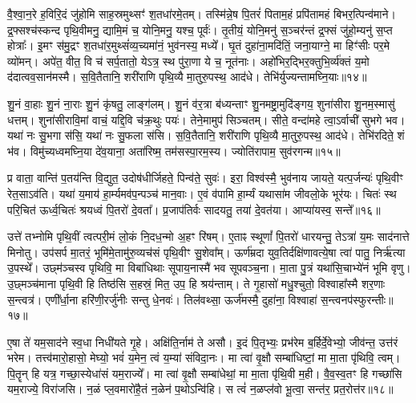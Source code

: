 वै॒श्वा॒न॒रे ह॒विरि॒दं जु॑होमि साह॒स्रमुथ्सꣳ॑ श॒तधा॑रमे॒तम्। 
तस्मि॑न्ने॒ष पि॒तरं॑ पिताम॒हं प्रपि॑तामहं बिभर॒त्पिन्व॑माने। 
द्र॒फ्सश्च॑स्कन्द पृथि॒वीमनु॒ द्यामि॒मं च॒ योनि॒मनु॒ यश्च॒ पूर्वः॑। 
तृ॒तीयं॒ योनि॒मनु॑ स॒ञ्चर॑न्तं द्र॒फ्सं जु॑हो॒म्यनु॑ स॒प्त होत्राः᳚। 
इ॒मꣳ स॑मु॒द्रꣳ श॒तधा॑र॒मुथ्सं॑व्य॒च्यमा॑नं॒ भुव॑नस्य॒ मध्ये᳚। 
घृ॒तं दुहा॑ना॒मदि॑तिं॒ जना॒याग्ने॒ मा हिꣳ॑सीः पर॒मे व्यो॑मन्। 
अपे॑त॒ वीत॒ वि च॑ सर्प॒तातो॒ येऽत्र॒ स्थ पु॑रा॒णा ये च॒ नूत॑नाः। 
अहो॑भिर॒द्भिर॒क्तुभि॒र्व्य॑क्तं य॒मो द॑दात्वव॒सान॑मस्मै। 
स॒वि॒तैतानि॒ शरी॑राणि पृथि॒व्यै मा॒तुरु॒पस्थ॒ आद॑धे। 
तेभि॑र्युज्यन्तामघ्नि॒याः॥१४॥

शु॒नं वा॒हाः  शु॒नं ना॒राः  शु॒नं कृ॑षतु॒ लाङ्ग॑लम्। 
शु॒नं व॑र॒त्रा ब॑ध्यन्ताꣳ शु॒नमष्ट्रा॒मुदि॑ङ्गय॒ शुना॑सीरा शु॒नम॒स्मासु॑ धत्तम्। 
शुना॑सीरावि॒मां वाचं॒ यद्दि॒वि च॑क्र॒थुः पयः॑। 
तेने॒मामुप॑ सिञ्चतम्। 
सीते॒ वन्दा॑महे त्वा॒ऽर्वाची॑ सुभगे भव। 
यथा॑ नः सु॒भगा स॑सि॒ यथा॑ नः सु॒फला स॑सि। 
स॒वि॒तैतानि॒ शरी॑राणि पृथि॒व्यै मा॒तुरु॒पस्थ॒ आद॑धे। 
तेभि॑रदिते॒ शं भ॑व। 
विमु॑च्यध्वमघ्नि॒या दे॑व॒याना॒ अता॑रिष्म॒ तम॑सस्पा॒रम॒स्य। 
ज्योति॑रापाम॒ सुव॑रगन्म॥१५॥

प्र वाता॒ वान्ति॑ प॒तय॑न्ति वि॒द्युत॒ उदोष॑धीर्जिहते॒ पिन्व॑ते॒ सुवः॑। 
इरा॒ विश्व॑स्मै॒ भुव॑नाय जायते॒ यत्प॒र्जन्यः॑ पृथि॒वीꣳ रेत॒साऽव॑ति। 
यथा॑ य॒माय॑ हा॒र्म्यमव॑प॒न्पञ्च॑ मान॒वाः। 
ए॒वं व॑पामि हा॒र्म्यं यथासा॑म जीवलो॒के भूर॑यः। 
चितः॑ स्थ परि॒चित॑ ऊर्ध्व॒चितः॑  श्रयध्वं पि॒तरो॑ दे॒वता᳚। 
प्र॒जाप॑तिर्वः सादयतु॒ तया॑ दे॒वत॑या। 
आप्या॑यस्व॒ सन्ते᳚॥१६॥
\anuvakamend[अ॒घ्नि॒या अ॑गन्म स॒प्त च॑]

उत्ते॑ तभ्नोमि पृथि॒वीं त्वत्परी॒मं लो॒कं नि॒दध॒न्मो अ॒हꣳ रि॑षम्। 
ए॒ताꣴ स्थूणां᳚ पि॒तरो॑ धारयन्तु॒ तेऽत्रा॑ य॒मः साद॑नात्ते मिनोतु। 
उप॑सर्प मा॒तरं॒ भूमि॑मे॒तामु॑रु॒व्यच॑सं पृथि॒वीꣳ सु॒शेवा᳚म्। 
ऊर्ण॑म्रदा युव॒तिर्दक्षि॑णावत्ये॒षा त्वा॑ पातु॒ निर्\mbox{}ऋ॑त्या उ॒पस्थे᳚। 
उछ्म॑ञ्चस्व पृथिवि॒ मा विबा॑धिथाः सूपाय॒नास्मै॑ भव सूपवञ्च॒ना। 
मा॒ता पु॒त्रं यथा॑सि॒चाभ्ये॑नं भूमि वृणु। 
उ॒छ्मञ्च॑माना पृथि॒वी हि तिष्ठ॑सि स॒हस्रं॒ मित॒ उप॒ हि श्रय॑न्ताम्। 
ते गृ॒हासो॑ मधु॒श्चुतो॒ विश्वाहा᳚स्मै शर॒णाः स॒न्त्वत्र॑। 
एणी᳚र्धा॒ना हरि॑णी॒रर्जु॑नीः सन्तु धे॒नवः॑। 
तिल॑वथ्सा॒ ऊर्ज॑मस्मै॒ दुहा॑ना॒ विश्वाहा॑ स॒न्त्वनप॑स्फुरन्तीः॥१७॥

ए॒षा ते॑ यम॒साद॑ने स्व॒धा निधी॑यते गृ॒हे। 
अक्षि॑ति॒र्नाम॑ ते असौ। 
इ॒दं पि॒तृभ्यः॒ प्रभ॑रेम ब॒र्\mbox{}हिर्दे॒वेभ्यो॒ जीव॑न्त॒ उत्त॑रं भरेम। 
तत्त्व॑मारो॒हासो॒ मेघ्यो॒ भवं॑ य॒मेन॒ त्वं य॒म्या॑ संविदा॒नः। 
मा त्वा॑ वृ॒क्षौ सम्बा॑धिष्टां॒ मा मा॒ता पृ॑थिवि॒ त्वम्। 
पि॒तॄन् हि यत्र॒ गच्छा॒स्येधा॑सं यम॒राज्ये᳚। 
मा त्वा॑ वृ॒क्षौ सम्बा॑धेथां॒ मा मा॒ता पृ॑थि॒वी म॒ही। 
वै॒व॒स्व॒तꣳ हि गच्छा॑सि यम॒राज्ये॒ विरा॑जसि। 
न॒ळं प्ल॒वमारो॑है॒तं न॒ळेन॑ प॒थोऽन्वि॑हि। 
स त्वं॑ न॒ळप्ल॑वो भू॒त्वा॒ सन्त॑र॒ प्रत॒रोत्त॑र॥१८॥

